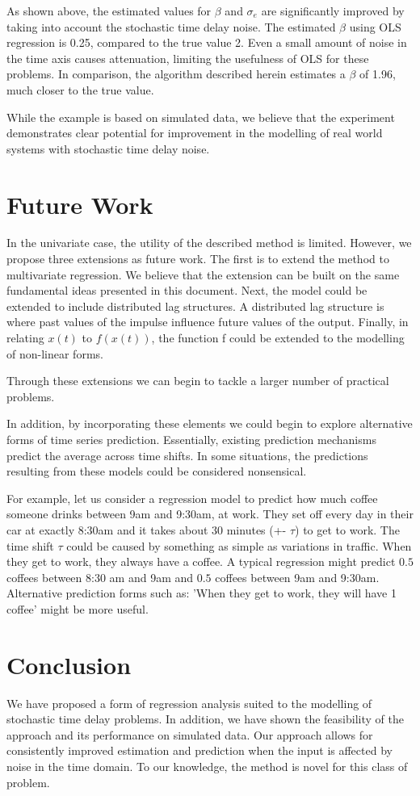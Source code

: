 \documentclass[11pt]{amsart}
\begin{document}
As shown above, the estimated values for $\beta$ and $\sigma_e$ are significantly improved by taking into account the stochastic time delay noise. The estimated $\beta$ using OLS regression is 0.25, compared to the true value 2. Even a small amount of noise in the time axis causes attenuation, 
limiting the usefulness of OLS for these problems.
In comparison, the algorithm described herein estimates a $\beta$ of 1.96, much closer to the true value.

While the example is based on simulated data, we believe that the experiment demonstrates clear potential for improvement in the modelling of real world systems with stochastic time delay noise.


\section{Future Work}

In the univariate case, the utility of the described method is limited. However, we propose three extensions as future work. The first is to extend the method to multivariate regression. We believe that the extension can be built on the same fundamental ideas presented in this document. Next, the model could be extended to include distributed lag structures. A distributed lag structure is where past values of the impulse influence future values of the output. Finally, in relating $x(t)$ to $f(x(t))$, the function f could be extended to the modelling of non-linear forms.

Through these extensions we can begin to tackle a larger number of practical problems.

In addition, by incorporating these elements we could begin to explore alternative forms of time series prediction. Essentially, existing prediction mechanisms predict the average across time shifts. In some situations, the predictions resulting from these models could be considered nonsensical.

For example, let us consider a regression model to predict how much coffee someone drinks between 9am and 9:30am, at work. They set off every day in their car at exactly 8:30am and it takes about 30 minutes (+- $\tau$) to get to work. The time shift $\tau$ could be caused by something as simple as variations in traffic. When they get to work, they always have a coffee. A typical regression might predict $0.5$ coffees between 8:30 am and 9am and $0.5$ coffees between 9am and 9:30am. Alternative prediction forms such as: 'When they get to work, they will have 1 coffee' might be more useful.


\section{Conclusion}

We have proposed a form of regression analysis suited to the modelling of stochastic time delay problems. In addition, we have shown the feasibility of the approach and its performance on simulated data. Our approach allows for consistently improved estimation and prediction when the input is affected by noise in the time domain. To our knowledge, the method is novel for this class of problem.
\end{document}
